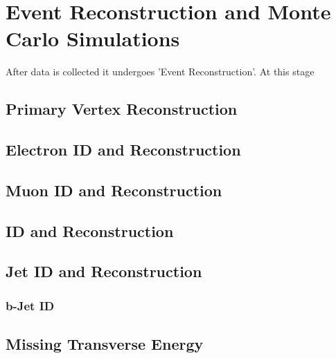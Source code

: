 \chapter{Event Reconstruction and Monte Carlo Simulations}
After data is collected it undergoes 'Event Reconstruction'.
At this stage %

\section{Primary Vertex Reconstruction}
\section{Electron ID and Reconstruction}
\section{Muon ID and Reconstruction}
\section{\tau ID and Reconstruction}
\section{Jet ID and Reconstruction}
\subsection{b-Jet ID}
\section{Missing Transverse Energy}
